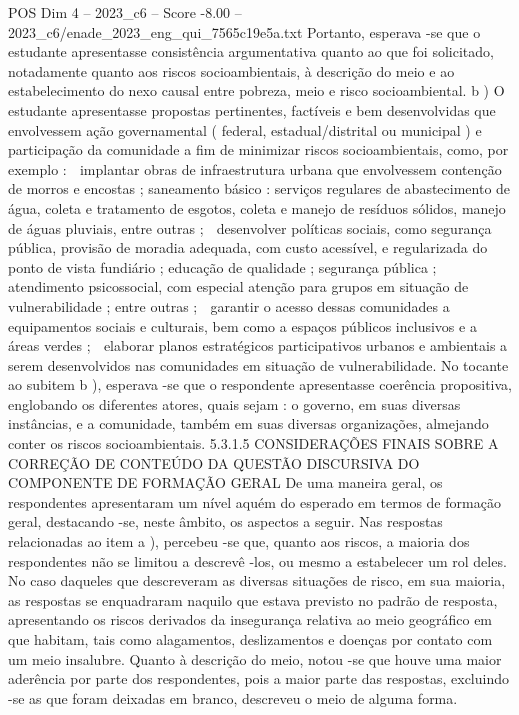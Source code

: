 \begin{textsample}{POS Dim 4 – 2023\_c6 – Score -8.00 – 2023\_c6/enade\_2023\_eng\_qui\_7565c19e5a.txt}
Portanto, esperava -se que o estudante apresentasse consistência argumentativa quanto ao que foi solicitado, notadamente quanto aos riscos socioambientais, à descrição do meio e ao estabelecimento do nexo causal entre pobreza, meio e risco socioambiental. b ) O estudante apresentasse propostas pertinentes, factíveis e bem desenvolvidas que envolvessem ação governamental ( federal, estadual/distrital ou municipal ) e participação da comunidade a fim de minimizar riscos socioambientais, como, por exemplo :  implantar obras de infraestrutura urbana que envolvessem contenção de morros e encostas ; saneamento básico : serviços regulares de abastecimento de água, coleta e tratamento de esgotos, coleta e manejo de resíduos sólidos, manejo de águas pluviais, entre outras ;  desenvolver políticas sociais, como segurança pública, provisão de moradia adequada, com custo acessível, e regularizada do ponto de vista fundiário ; educação de qualidade ; segurança pública ; atendimento psicossocial, com especial atenção para grupos em situação de vulnerabilidade ; entre outras ;  garantir o acesso dessas comunidades a equipamentos sociais e culturais, bem como a espaços públicos inclusivos e a áreas verdes ;  elaborar planos estratégicos participativos urbanos e ambientais a serem desenvolvidos nas comunidades em situação de vulnerabilidade.
No tocante ao subitem b ), esperava -se que o respondente apresentasse coerência propositiva, englobando os diferentes atores, quais sejam : o governo, em suas diversas instâncias, e a comunidade, também em suas diversas organizações, almejando conter os riscos socioambientais. 5.3.1.5 CONSIDERAÇÕES FINAIS SOBRE A CORREÇÃO DE CONTEÚDO DA QUESTÃO DISCURSIVA DO COMPONENTE DE FORMAÇÃO GERAL De uma maneira geral, os respondentes apresentaram um nível aquém do esperado em termos de formação geral, destacando -se, neste âmbito, os aspectos a seguir.
Nas respostas relacionadas ao item a ), percebeu -se que, quanto aos riscos, a maioria dos respondentes não se limitou a descrevê -los, ou mesmo a estabelecer um rol deles.
No caso daqueles que descreveram as diversas situações de risco, em sua maioria, as respostas se enquadraram naquilo que estava previsto no padrão de resposta, apresentando os riscos derivados da insegurança relativa ao meio geográfico em que habitam, tais como alagamentos, deslizamentos e doenças por contato com um meio insalubre.
Quanto à descrição do meio, notou -se que houve uma maior aderência por parte dos respondentes, pois a maior parte das respostas, excluindo -se as que foram deixadas em branco, descreveu o meio de alguma forma.

\end{textsample}
